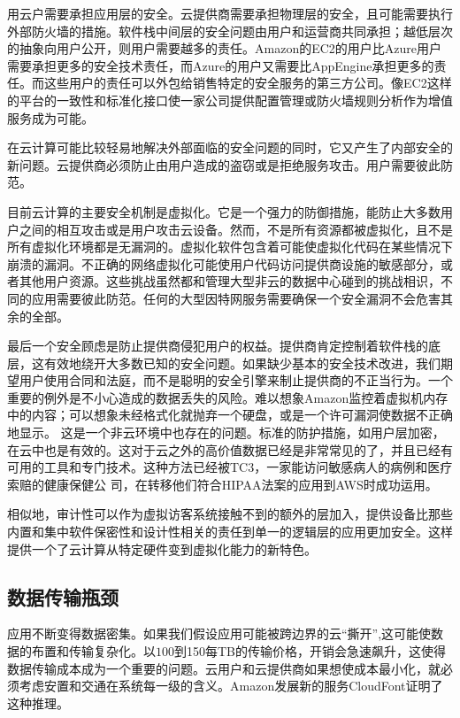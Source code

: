 用云户需要承担应用层的安全。云提供商需要承担物理层的安全，且可能需要执行外部防火墙的措施。软件栈中间层的安全问题由用户和运营商共同承担；越低层次的抽象向用户公开，则用户需要越多的责任。Amazon的EC2的用户比Azure用户需要承担更多的安全技术责任，而Azure的用户又需要比AppEngine承担更多的责任。而这些用户的责任可以外包给销售特定的安全服务的第三方公司。像EC2这样的平台的一致性和标准化接口使一家公司提供配置管理或防火墙规则分析作为增值服务成为可能。

在云计算可能比较轻易地解决外部面临的安全问题的同时，它又产生了内部安全的新问题。云提供商必须防止由用户造成的盗窃或是拒绝服务攻击。用户需要彼此防范。

目前云计算的主要安全机制是虚拟化。它是一个强力的防御措施，能防止大多数用户之间的相互攻击或是用户攻击云设备。然而，不是所有资源都被虚拟化，且不是所有虚拟化环境都是无漏洞的。虚拟化软件包含着可能使虚拟化代码在某些情况下崩溃的漏洞。不正确的网络虚拟化可能使用户代码访问提供商设施的敏感部分，或者其他用户资源。这些挑战虽然都和管理大型非云的数据中心碰到的挑战相识，不同的应用需要彼此防范。任何的大型因特网服务需要确保一个安全漏洞不会危害其余的全部。

最后一个安全顾虑是防止提供商侵犯用户的权益。提供商肯定控制着软件栈的底层，这有效地绕开大多数已知的安全问题。如果缺少基本的安全技术改进，我们期望用户使用合同和法庭，而不是聪明的安全引擎来制止提供商的不正当行为。一个重要的例外是不小心造成的数据丢失的风险。难以想象Amazon监控着虚拟机内存中的内容；可以想象未经格式化就抛弃一个硬盘，或是一个许可漏洞使数据不正确地显示。
这是一个非云环境中也存在的问题。标准的防护措施，如用户层加密，在云中也是有效的。这对于云之外的高价值数据已经是非常常见的了，并且已经有可用的工具和专门技术。这种方法已经被TC3，一家能访问敏感病人的病例和医疗索赔的健康保健公
司，在转移他们符合HIPAA法案的应用到AWS时成功运用。

相似地，审计性可以作为虚拟访客系统接触不到的额外的层加入，提供设备比那些内置和集中软件保密性和设计性相关的责任到单一的逻辑层的应用更加安全。这样提供一个了云计算从特定硬件变到虚拟化能力的新特色。

\subsection{数据传输瓶颈}

应用不断变得数据密集。如果我们假设应用可能被跨边界的云“撕开”,这可能使数据的布置和传输复杂化。以$100到$150每TB的传输价格，开销会急速飙升，这使得数据传输成本成为一个重要的问题。云用户和云提供商如果想使成本最小化，就必须考虑安置和交通在系统每一级的含义。Amazon发展新的服务CloudFont证明了这种推理。

